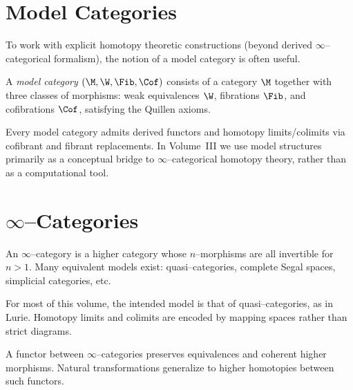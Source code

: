 \section{Model Categories}

To work with explicit homotopy theoretic constructions (beyond derived
$\infty$--categorical formalism), the notion of a model category is often
useful.

\begin{definition}
A \emph{model category} $(\M,\W,\Fib,\Cof)$ consists of a category $\M$ together
with three classes of morphisms: weak equivalences $\W$, fibrations $\Fib$, and
cofibrations $\Cof$, satisfying the Quillen axioms.
\end{definition}

Every model category admits derived functors and homotopy limits/colimits via
cofibrant and fibrant replacements.  In Volume~III we use model structures
primarily as a conceptual bridge to $\infty$--categorical homotopy theory,
rather than as a computational tool.

\section{$\infty$--Categories}

\begin{definition}
An $\infty$--category is a higher category whose $n$--morphisms are all
invertible for $n>1$.  Many equivalent models exist: quasi--categories,
complete Segal spaces, simplicial categories, etc.
\end{definition}

\begin{remark}
For most of this volume, the intended model is that of quasi--categories, as in
Lurie.  Homotopy limits and colimits are encoded by mapping spaces rather than
strict diagrams.
\end{remark}

\begin{definition}
A functor between $\infty$--categories preserves equivalences and coherent
higher morphisms.  Natural transformations generalize to higher homotopies
between such functors.
\end{definition}

